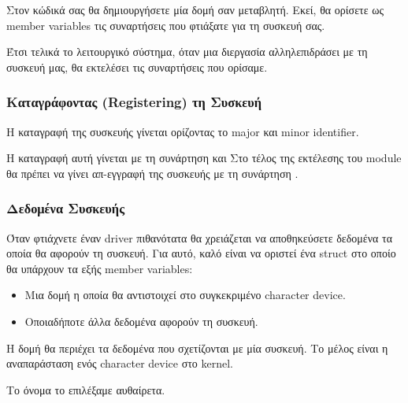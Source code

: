 \documentclass[18pt]{extarticle}
\begin{document}
Στον κώδικά σας θα δημιουργήσετε μία δομή  σαν μεταβλητή. 
Εκεί, θα ορίσετε ως member variables τις συναρτήσεις που φτιάξατε για τη συσκευή σας.

\begin{file}
        
\end{file}

Έτσι τελικά το λειτουργικό σύστημα, όταν μια διεργασία αλληλεπιδράσει με τη συσκευή μας, 
θα εκτελέσει τις συναρτήσεις που ορίσαμε.

\subsubsection{Καταγράφοντας (Registering) τη Συσκευή}

Η καταγραφή της συσκευής γίνεται ορίζοντας το major και minor identifier.

Η καταγραφή αυτή γίνεται με τη συνάρτηση  και 
Στο τέλος της εκτέλεσης του module θα πρέπει να γίνει απ-εγγραφή της συσκευής με τη συνάρτηση .

\begin{file}
    \makebox{}
\end{file}

\subsubsection{Δεδομένα Συσκευής}

Όταν φτιάχνετε έναν driver πιθανότατα θα χρειάζεται να αποθηκεύσετε δεδομένα τα οποία θα αφορούν τη συσκευή.
Για αυτό, καλό είναι να οριστεί ένα struct στο οποίο θα υπάρχουν τα εξής member variables:

\begin{itemize}
    \item Μια δομή  η οποία θα αντιστοιχεί στο συγκεκριμένο character device.
    \item Οποιαδήποτε άλλα δεδομένα αφορούν τη συσκευή.
\end{itemize}

Η δομή  θα περιέχει τα δεδομένα που σχετίζονται με μία συσκευή.
Το μέλος  είναι η αναπαράσταση ενός character device στο kernel. 

\begin{info}[Σημείωση]
    Το όνομα  το επιλέξαμε αυθαίρετα.
\end{info}
\end{document}
